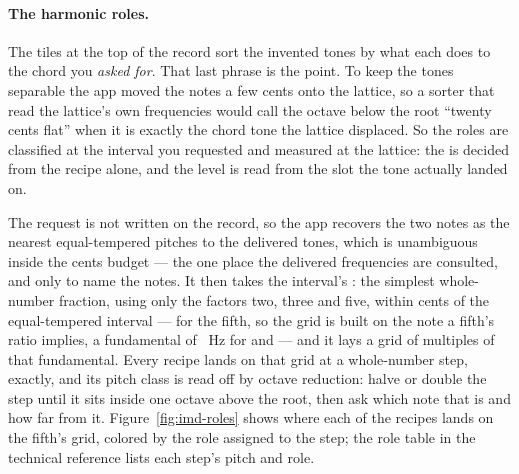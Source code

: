 \documentclass[11pt,a4paper]{article}
\begin{document}
\paragraph{The harmonic roles.} The tiles at the top of the record sort
the invented tones by what each does to the chord you \emph{asked for}.
That last phrase is the point. To keep the tones separable the app moved
the notes a few cents onto the lattice, so a sorter that read the lattice's
own frequencies would call the octave below the root ``twenty cents
flat'' when it is exactly the chord tone the lattice displaced. So the
roles are classified at the interval you requested and measured at the
lattice: the  is decided from the recipe alone, and
the level is read from the slot the tone actually landed on.

The request is not written on the record, so the app recovers the two
notes as the nearest equal-tempered pitches to the delivered tones, which
is unambiguous inside the cents budget --- the one place the delivered
frequencies are consulted, and only to name the notes. It then takes the
interval's : the simplest whole-number fraction, using
only the factors two, three and five, within \imdPitchToleranceCents{}
cents of the equal-tempered interval --- \imdFifthJustRatio{} for the
fifth, so the grid is built on the note a fifth's ratio implies, a
fundamental of \imdFifthGridHz{}~Hz for \imdNoteOne{} and
\imdNoteTwo{} --- and it lays a grid of multiples of that fundamental.
Every recipe lands on that grid at a whole-number step, exactly, and its
pitch class is read off by octave reduction: halve or double the step
until it sits inside one octave above the root, then ask which note that
is and how far from it. Figure~\ref{fig:imd-roles} shows where each of
the \imdRecipeCount{} recipes lands on the fifth's grid, colored by the
role assigned to the step; the role table in the technical reference
lists each step's pitch and role.
\end{document}
